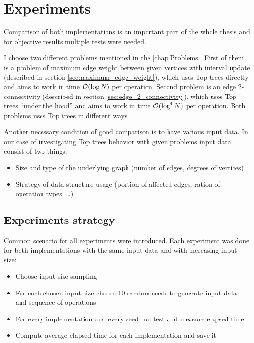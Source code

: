 \chapter{Experiments}
\label{chap:Experiments}

Comparison of both implementations is an important part of the whole thesis
and for objective results multiple tests were needed.

I choose two different problems mentioned in the \cref{chap:Problems}.
First of them is a problem of maximum edge weight between given vertices with
interval update (described in section \ref{sec:maximum_edge_weight}), which uses
Top trees directly and aims to work in time ${\cal O}(\log N)$ per operation. Second
problem is an edge 2-connectivity (described in section \ref{sec:edge_2_connectivity}),
which uses Top trees ``under the hood'' and aims to work in time ${\cal O}(\log^4 N)$
per operation. Both problems uses Top trees in different ways.

Another necessary condition of good comparison is to have various input data. In
our case of investigating Top trees behavior with given problems input data
consist of two things:
\begin{itemize}
\item Size and type of the underlying graph (number of edges, degrees of vertices)
\item Strategy of data structure usage (portion of affected edges, ration of
operation types, \dots)
\end{itemize}

\section{Experiments strategy}

Common scenario for all experiments were introduced. Each experiment was done
for both implementations with the same input data and with increasing input
size:

\begin{itemize}
\item Choose input size sampling
\item For each chosen input size choose 10 random seeds to generate input data
and sequence of operations
\item For every implementation and every seed run test and measure elapsed time
\item Compute average elapsed time for each implementation and save it
\end{itemize}

